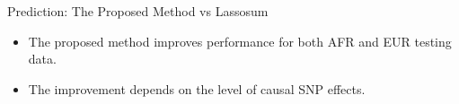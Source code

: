 \documentclass{beamer}
\begin{document}
\begin{frame}{Prediction: The Proposed Method vs Lassosum}

\begin{figure}[h]	\noindent{}
      \label{fig:our-EUR vs our-AFR}
\end{figure}
\begin{itemize}
    \item The proposed method improves performance for both AFR and EUR testing data.
    \item The improvement depends on the level of causal SNP effects.
\end{itemize}
\end{frame}
\end{document}
